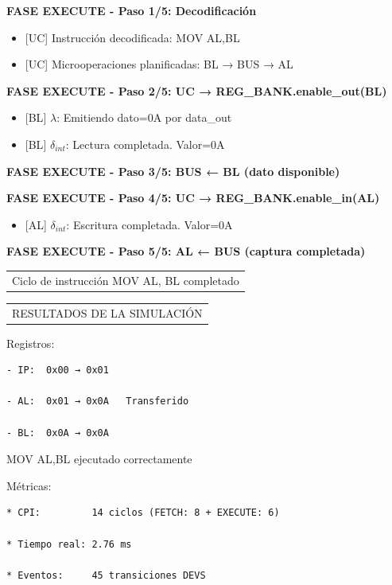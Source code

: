 \documentclass[12pt,oneside]{templates/unerthesis}
\providecommand{\tightlist}{%
  \setlength{\itemsep}{0pt}\setlength{\parskip}{0pt}}
\begin{document}
\textbf{FASE EXECUTE - Paso 1/5: Decodificación}

\begin{itemize}
\item
  {[}UC{]} Instrucción decodificada: MOV AL,BL
\item
  {[}UC{]} Microoperaciones planificadas: BL → BUS → AL
\end{itemize}

\textbf{FASE EXECUTE - Paso 2/5: UC → REG\_BANK.enable\_out(BL)}

\begin{itemize}
\item
  {[}BL{]} \(\lambda\): Emitiendo dato=0A por data\_out
\item
  {[}BL{]} \(\delta_{int}\): Lectura completada. Valor=0A
\end{itemize}

\textbf{FASE EXECUTE - Paso 3/5: BUS ← BL (dato disponible)}

\textbf{FASE EXECUTE - Paso 4/5: UC → REG\_BANK.enable\_in(AL)}

\begin{itemize}
\tightlist
\item
  {[}AL{]} \(\delta_{int}\): Escritura completada. Valor=0A
\end{itemize}

\textbf{FASE EXECUTE - Paso 5/5: AL ← BUS (captura completada)}

\begin{longtable}[]{@{}c@{}}
\toprule\noalign{}
\endhead
\bottomrule\noalign{}
\endlastfoot
Ciclo de instrucción MOV AL, BL completado \\
\end{longtable}

\begin{longtable}[]{@{}c@{}}
\toprule\noalign{}
\endhead
\bottomrule\noalign{}
\endlastfoot
RESULTADOS DE LA SIMULACIÓN \\
\end{longtable}

Registros:

\begin{verbatim}
- IP:  0x00 → 0x01

- AL:  0x01 → 0x0A   Transferido

- BL:  0x0A → 0x0A  
\end{verbatim}

MOV AL,BL ejecutado correctamente

Métricas:

\begin{verbatim}
* CPI:         14 ciclos (FETCH: 8 + EXECUTE: 6)

* Tiempo real: 2.76 ms

* Eventos:     45 transiciones DEVS
\end{verbatim}
\end{document}
